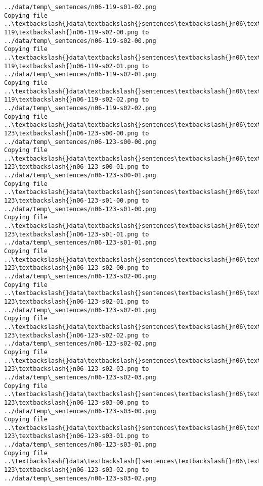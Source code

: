\documentclass[11pt]{article}
\begin{document}
\begin{Verbatim}[commandchars=\\\{\}]
../data/temp\_sentences/n06-119-s01-02.png
Copying file ..\textbackslash{}data\textbackslash{}sentences\textbackslash{}n06\textbackslash{}n06-119\textbackslash{}n06-119-s02-00.png to
../data/temp\_sentences/n06-119-s02-00.png
Copying file ..\textbackslash{}data\textbackslash{}sentences\textbackslash{}n06\textbackslash{}n06-119\textbackslash{}n06-119-s02-01.png to
../data/temp\_sentences/n06-119-s02-01.png
Copying file ..\textbackslash{}data\textbackslash{}sentences\textbackslash{}n06\textbackslash{}n06-119\textbackslash{}n06-119-s02-02.png to
../data/temp\_sentences/n06-119-s02-02.png
Copying file ..\textbackslash{}data\textbackslash{}sentences\textbackslash{}n06\textbackslash{}n06-123\textbackslash{}n06-123-s00-00.png to
../data/temp\_sentences/n06-123-s00-00.png
Copying file ..\textbackslash{}data\textbackslash{}sentences\textbackslash{}n06\textbackslash{}n06-123\textbackslash{}n06-123-s00-01.png to
../data/temp\_sentences/n06-123-s00-01.png
Copying file ..\textbackslash{}data\textbackslash{}sentences\textbackslash{}n06\textbackslash{}n06-123\textbackslash{}n06-123-s01-00.png to
../data/temp\_sentences/n06-123-s01-00.png
Copying file ..\textbackslash{}data\textbackslash{}sentences\textbackslash{}n06\textbackslash{}n06-123\textbackslash{}n06-123-s01-01.png to
../data/temp\_sentences/n06-123-s01-01.png
Copying file ..\textbackslash{}data\textbackslash{}sentences\textbackslash{}n06\textbackslash{}n06-123\textbackslash{}n06-123-s02-00.png to
../data/temp\_sentences/n06-123-s02-00.png
Copying file ..\textbackslash{}data\textbackslash{}sentences\textbackslash{}n06\textbackslash{}n06-123\textbackslash{}n06-123-s02-01.png to
../data/temp\_sentences/n06-123-s02-01.png
Copying file ..\textbackslash{}data\textbackslash{}sentences\textbackslash{}n06\textbackslash{}n06-123\textbackslash{}n06-123-s02-02.png to
../data/temp\_sentences/n06-123-s02-02.png
Copying file ..\textbackslash{}data\textbackslash{}sentences\textbackslash{}n06\textbackslash{}n06-123\textbackslash{}n06-123-s02-03.png to
../data/temp\_sentences/n06-123-s02-03.png
Copying file ..\textbackslash{}data\textbackslash{}sentences\textbackslash{}n06\textbackslash{}n06-123\textbackslash{}n06-123-s03-00.png to
../data/temp\_sentences/n06-123-s03-00.png
Copying file ..\textbackslash{}data\textbackslash{}sentences\textbackslash{}n06\textbackslash{}n06-123\textbackslash{}n06-123-s03-01.png to
../data/temp\_sentences/n06-123-s03-01.png
Copying file ..\textbackslash{}data\textbackslash{}sentences\textbackslash{}n06\textbackslash{}n06-123\textbackslash{}n06-123-s03-02.png to
../data/temp\_sentences/n06-123-s03-02.png

\end{Verbatim}
\end{document}
